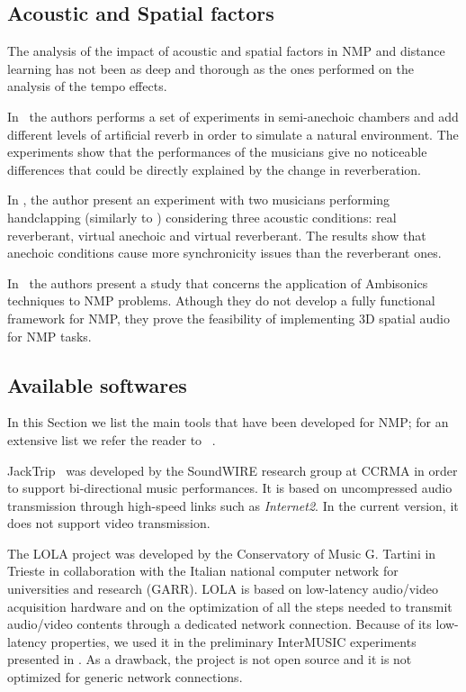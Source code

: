 \subsection{Acoustic and Spatial factors}\label{subsec:acoustics}
The analysis of the impact of acoustic and spatial factors in NMP and distance learning has not been as deep and thorough as the ones performed on the analysis of the tempo effects. 

In~\cite{carot2009towards} the authors performs a set of experiments in semi-anechoic chambers and add different levels of artificial reverb in order to simulate a natural environment. The experiments show that the performances of the musicians give no noticeable differences that could be directly explained by the change in reverberation. 

In \cite{FarnerReverb}, the author present an experiment with two musicians performing handclapping (similarly to \cite{Chafe1}) considering three acoustic conditions: real reverberant, virtual anechoic and virtual reverberant. The results show that anechoic conditions cause more synchronicity issues than the reverberant ones.

In~\cite{gurevich2011ambisonic} the authors present a study that concerns the application of Ambisonics techniques to NMP problems. Athough they do not develop a fully functional framework for NMP, they prove the feasibility of implementing 3D spatial audio for NMP tasks. %


\subsection{Available softwares}\label{subsec:sw}
In this Section we list the main tools that have been developed for NMP; for an extensive list we refer the reader to ~\cite{RottondiOverview}.

JackTrip~\cite{CaceresJacktrip} was developed by the SoundWIRE research group at CCRMA in order to support bi-directional music performances. It is based on uncompressed audio transmission through high-speed links such as \textit{Internet2}. In the current version, it does not support video transmission.

The LOLA\cite{drioli2013networked} project was developed by the Conservatory of Music G. Tartini in Trieste in collaboration with the Italian national computer network for universities and research (GARR). LOLA is based on low-latency audio/video acquisition hardware and on the optimization of all the steps needed to transmit audio/video contents through a dedicated network connection. Because of  its low-latency properties, we used it in the preliminary InterMUSIC experiments presented in \cite{CIM2018}. As a drawback, the project is not open source and it is not optimized for generic network connections.

